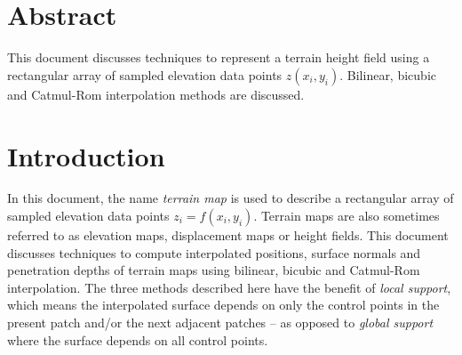 \documentclass[
10pt, %
a4paper, %
oneside, %
headinclude,footinclude, %
BCOR5mm, %
]{scrartcl}
\title{\normalfont\spacedallcaps{Surface Approximation for Terrain Modeling}} %
\author{\spacedlowsmallcaps{Kristopher Wehage*}} %
\date{} %
\begin{document}

\renewcommand{\sectionmark}[1]{\markright{\spacedlowsmallcaps{#1}}} %
\lehead{\mbox{\llap{\small\thepage\kern1em\color{halfgray} \vline}\color{halfgray}\hspace{0.5em}\rightmark\hfil}} %

\pagestyle{scrheadings} %


\maketitle %

\setcounter{tocdepth}{2} %

\tableofcontents %

\listoffigures %

\listoftables %

\section*{Abstract}

This document discusses techniques to represent a terrain height field using a rectangular array of sampled elevation data points $z(x_i, y_i)$. Bilinear, bicubic and Catmul-Rom interpolation methods are discussed.


{\let\thefootnote\relax{}}


\newpage


\section{Introduction}
In this document, the name \emph{terrain map} is used to describe a rectangular array of sampled elevation data points $z_i = f(x_i, y_i)$. Terrain maps are also sometimes referred to as elevation maps, displacement maps or height fields. This document discusses techniques to compute interpolated positions, surface normals and penetration depths of terrain maps using bilinear, bicubic and Catmul-Rom interpolation. The three methods described here have the benefit of \emph{local support}, which means the interpolated surface depends on only the control points in the present patch and/or the next adjacent patches -- as opposed to \emph{global support} where the surface depends on all control points.
\end{document}
